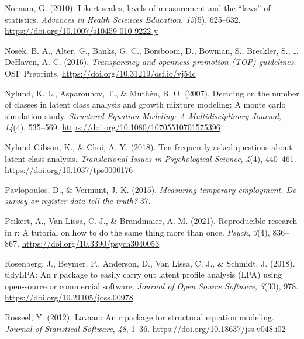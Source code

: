 \documentclass[
  ,man,floatsintext]{apa6}
\newlength{\cslhangindent}
\newlength{\cslentryspacingunit} %
\newenvironment{CSLReferences}[2] %
 {%
  \setlength{\parindent}{0pt}
  \ifodd #1
  \let\oldpar\par
  \def\par{\hangindent=\cslhangindent\oldpar}
  \fi
  \setlength{\parskip}{#2\cslentryspacingunit}
 }%
 {}
\begin{document}
\begin{CSLReferences}{1}{0}
\leavevmode{}%
Norman, G. (2010). Likert scales, levels of measurement and the {``laws''} of statistics. \emph{Advances in Health Sciences Education}, \emph{15}(5), 625--632. \url{https://doi.org/10.1007/s10459-010-9222-y}

\leavevmode{}%
Nosek, B. A., Alter, G., Banks, G. C., Borsboom, D., Bowman, S., Breckler, S., \ldots{} DeHaven, A. C. (2016). \emph{Transparency and openness promotion ({TOP}) guidelines}. {OSF} Preprints. \url{https://doi.org/10.31219/osf.io/vj54c}

\leavevmode{}%
Nylund, K. L., Asparouhov, T., \& Muthén, B. O. (2007). Deciding on the number of classes in latent class analysis and growth mixture modeling: A monte carlo simulation study. \emph{Structural Equation Modeling: A Multidisciplinary Journal}, \emph{14}(4), 535--569. \url{https://doi.org/10.1080/10705510701575396}

\leavevmode{}%
Nylund-Gibson, K., \& Choi, A. Y. (2018). Ten frequently asked questions about latent class analysis. \emph{Translational Issues in Psychological Science}, \emph{4}(4), 440--461. \url{https://doi.org/10.1037/tps0000176}

\leavevmode{}%
Pavlopoulos, D., \& Vermunt, J. K. (2015). \emph{Measuring temporary employment. Do survey or register data tell the truth?} 37.

\leavevmode{}%
Peikert, A., Van Lissa, C. J., \& Brandmaier, A. M. (2021). Reproducible research in r: A tutorial on how to do the same thing more than once. \emph{Psych}, \emph{3}(4), 836--867. \url{https://doi.org/10.3390/psych3040053}

\leavevmode{}%
Rosenberg, J., Beymer, P., Anderson, D., Van Lissa, C. J., \& Schmidt, J. (2018). {tidyLPA}: An r package to easily carry out latent profile analysis ({LPA}) using open-source or commercial software. \emph{Journal of Open Source Software}, \emph{3}(30), 978. \url{https://doi.org/10.21105/joss.00978}

\leavevmode{}%
Rosseel, Y. (2012). Lavaan: An r package for structural equation modeling. \emph{Journal of Statistical Software}, \emph{48}, 1--36. \url{https://doi.org/10.18637/jss.v048.i02}


\end{CSLReferences}
\end{document}

